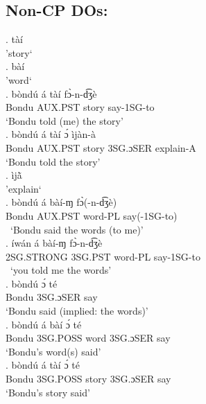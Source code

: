 \documentclass{assets/fieldnotes}
\begin{document}
{\subsection{Non-CP DOs:}

\exg. tàí\\
'story` \\

\exg. bàí\\
'word` \\

\exg. bòndú á tàí fɔ̀-n-d͡ʒè\\
Bondu AUX.PST story say-1SG-to\\
`Bondu told (me) the story' \\

\exg. bòndú á tàí ɔ́ ìjàn-à\\
Bondu AUX.PST story 3SG.ɔSER explain-A\\
`Bondu told the story' \\

\exg. ìjã̀\\
'explain` \\


\exg. bòndú á bàí-ɱ fɔ̀(-n-d͡ʒè)\\
Bondu AUX.PST word-PL say(-1SG-to)\\\
`Bondu said the words (to me)' \\


\exg. íwán á bàí-ɱ fɔ̀-n-d͡ʒè\\
2SG.STRONG 3SG.PST word-PL say-1SG-to\\\
`you told me the words' \\


\exg. bòndú ɔ́ té\\
Bondu 3SG.ɔSER say\\
`Bondu said (implied: the words)' \\

\exg. bòndú á bàí ɔ́ té\\
Bondu 3SG.POSS word 3SG.ɔSER say\\
`Bondu's word(s) said' \\

\exg. bòndú á tàí ɔ́ té\\
Bondu 3SG.POSS story 3SG.ɔSER say\\
`Bondu's story said' \\

}
\end{document}
